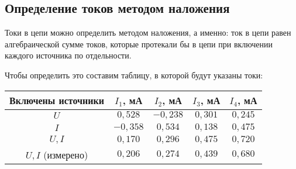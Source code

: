 \subsection{Определение токов методом наложения}
Токи в цепи можно определить методом наложения, а именно:
ток в цепи равен алгебраической сумме токов, которые протекали бы
в цепи при включении каждого источника по отдельности.

Чтобы определить это составим таблицу, в которой будут указаны токи:

\begin{tabular}{|c|c|c|c|c|}
    \hline
    Включены источники & $I_1$, мА & $I_2$, мА & $I_3$, мА & $I_4$, мА \\
    \hline
    $U$                & $0,528$   & $-0,238$  & $0,301$   & $0,245$   \\
    \hline
    $I $               & $-0,358$  & $0,534$   & $0,138$   & $0,475$   \\
    \hline
    $U, I$             & $0,170$   & $0,296$   & $0,475$   & $0,720$   \\
    \hline
    $U, I$ (измерено)  & $0,206$   & $0,274$   & $0,439$   & $0,680$   \\
    \hline
\end{tabular}

